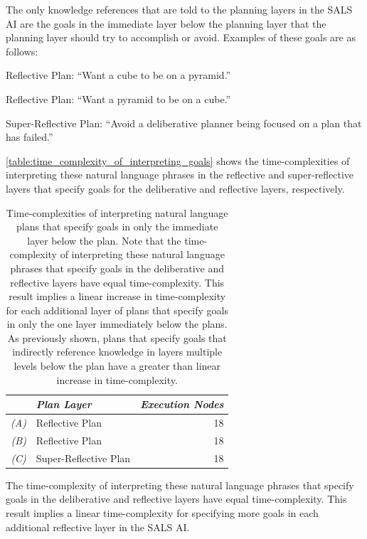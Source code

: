 The only knowledge references that are told to the planning layers in
the SALS AI are the goals in the immediate layer below the planning
layer that the planning layer should try to accomplish or avoid.
Examples of these goals are as follows:
\begin{packed_enumerate}
\item{Reflective Plan: ``Want a cube to be on a pyramid.''}
\item{Reflective Plan: ``Want a pyramid to be on a cube.''}
\item{Super-Reflective Plan: ``Avoid a deliberative planner being
  focused on a plan that has failed.''}
\end{packed_enumerate}
{\mbox{\autoref{table:time_complexity_of_interpreting_goals}}} shows
the time-complexities of interpreting these natural language phrases
in the reflective and super-reflective layers that specify goals for
the deliberative and reflective layers, respectively.
\begin{table}
\centering
\begin{tabular}{|r l|r|}
\hline
           &\emph{Plan Layer}     &\emph{Execution Nodes} \\
\hline
\emph{(A)} &Reflective Plan       & 18                    \\
\hline
\emph{(B)} &Reflective Plan       & 18                    \\
\hline
\emph{(C)} &Super-Reflective Plan & 18                    \\
\hline
\end{tabular}
\caption[Time-complexities of interpreting natural language plans that
  specify goals in only the immediate layer below the
  plan.]{Time-complexities of interpreting natural language plans that
  specify goals in only the immediate layer below the plan.  Note that
  the time-complexity of interpreting these natural language phrases
  that specify goals in the deliberative and reflective layers have
  equal time-complexity.  This result implies a linear increase in
  time-complexity for each additional layer of plans that specify
  goals in only the one layer immediately below the plans.  As
  previously shown, plans that specify goals that indirectly reference
  knowledge in layers multiple levels below the plan have a greater
  than linear increase in time-complexity.}
\label{table:time_complexity_of_interpreting_goals}
\end{table}
The time-complexity of interpreting these natural language phrases
that specify goals in the deliberative and reflective layers have
equal time-complexity.  This result implies a linear time-complexity
for specifying more goals in each additional reflective layer in the
SALS AI.


